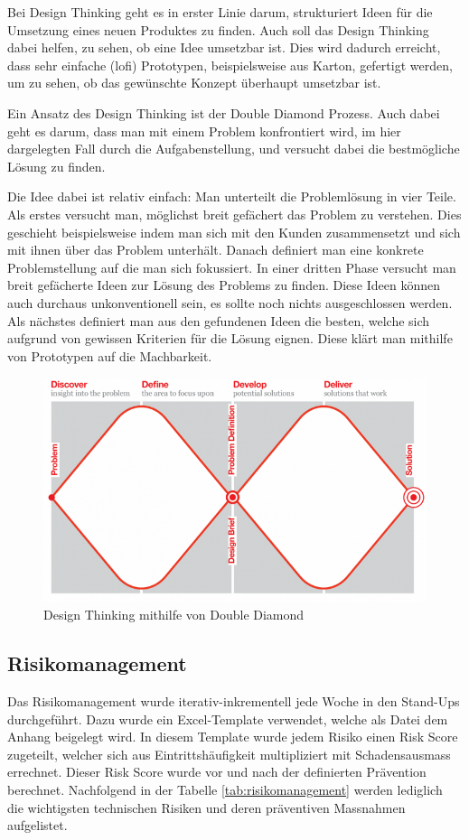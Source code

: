 Bei Design Thinking \cite{Wikipedia-Design-Thinking} geht es in erster Linie darum, strukturiert 
Ideen für die Umsetzung eines neuen Produktes zu finden. Auch soll das Design Thinking
dabei helfen, zu sehen, ob eine Idee umsetzbar ist. Dies wird dadurch erreicht,
dass sehr einfache (\acrshort{lofi}) Prototypen, beispielsweise aus Karton, 
gefertigt werden, um zu sehen, ob das gewünschte Konzept überhaupt umsetzbar ist.

Ein Ansatz des Design Thinking ist der Double Diamond Prozess. Auch dabei geht es
darum, dass man mit einem Problem konfrontiert wird, im hier dargelegten Fall durch die 
Aufgabenstellung, und versucht dabei die bestmögliche Lösung zu finden.

Die Idee dabei ist relativ einfach: Man unterteilt die Problemlösung in vier Teile.
Als erstes versucht man, möglichst breit gefächert das Problem zu verstehen. Dies geschieht
beispielsweise indem man sich mit den Kunden zusammensetzt und sich mit ihnen über das Problem unterhält.
Danach definiert man eine konkrete Problemstellung auf die man sich fokussiert.
In einer dritten Phase versucht man breit gefächerte Ideen zur Lösung des Problems zu finden.
Diese Ideen können auch durchaus unkonventionell sein, es sollte noch nichts ausgeschlossen werden.
Als nächstes definiert man aus den gefundenen Ideen
die besten, welche sich aufgrund von gewissen Kriterien für die Lösung eignen.
Diese klärt man mithilfe von Prototypen auf die Machbarkeit.
\begin{figure}[H]
  \includegraphics[width=1.0\textwidth]{img/double-diamond}
  \centering
  \caption{Design Thinking mithilfe von Double Diamond}
\end{figure}
  
\subsection{Risikomanagement}
\label{sec:risikomanagement}
Das Risikomanagement wurde iterativ-inkrementell jede Woche in den Stand-Ups durchgeführt. Dazu wurde ein Excel-Template verwendet, welche als Datei dem Anhang beigelegt wird. In diesem Template wurde jedem Risiko einen Risk Score zugeteilt, welcher sich aus Eintrittshäufigkeit multipliziert mit Schadensausmass errechnet. Dieser Risk Score wurde vor und nach der definierten Prävention berechnet. Nachfolgend in der Tabelle \ref{tab:risikomanagement} werden lediglich die wichtigsten technischen Risiken und deren präventiven Massnahmen aufgelistet.

